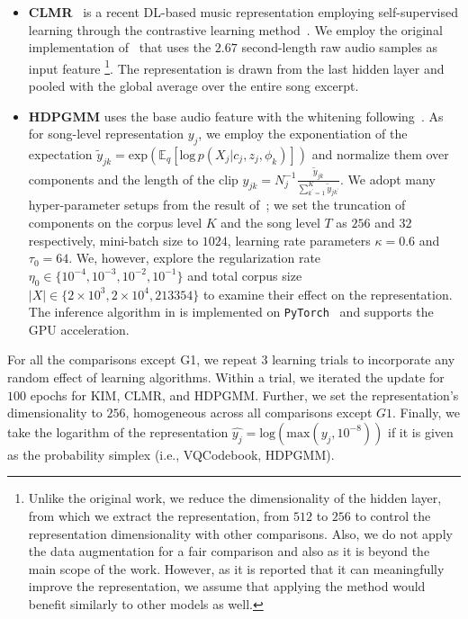\documentclass{article}
\begin{document}
\begin{itemize}[noitemsep, leftmargin=*]
    \item \textbf{CLMR}~\cite{DBLP:conf/ismir/SpijkervetB21} is a recent DL-based music representation employing self-supervised learning through the contrastive learning method~\cite{DBLP:conf/icml/ChenK0H20}. We employ the original implementation of~\cite{DBLP:conf/ismir/SpijkervetB21} that uses the $2.67$ second-length raw audio samples as input feature
        \footnote{Unlike the original work, we reduce the dimensionality of the hidden layer, from which we extract the representation, from $512$ to $256$ to control the representation dimensionality with other comparisons. Also, we do not apply the data augmentation for a fair comparison and also as it is beyond the main scope of the work. However, as it is reported that it can meaningfully improve the representation, we assume that applying the method would benefit similarly to other models as well.}.
        The representation is drawn from the last hidden layer and pooled with the global average over the entire song excerpt.

    \item \textbf{HDPGMM}
        uses the base audio feature with the whitening following~\cite{DBLP:conf/ismir/NamHSS12}. As for song-level representation $y_{j}$, we employ the  exponentiation of the expectation $\tilde{y}_{jk} = \text{exp}(\mathbb{E}_{q}[\text{log}\,p(X_{j}|c_{j}, z_{j}, \phi_{k})])$ and normalize them over components and the length of the clip $y_{jk} = N_{j}^{-1}\frac{\tilde{y}_{jk}}{\sum_{k^{\prime}=1}^{K}\tilde{y}_{jk^{\prime}}}$. We adopt many hyper-parameter setups from the result of~\cite{DBLP:journals/jmlr/WangPB11}; we set the truncation of components on the corpus level $K$ and the song level $T$ as $256$ and $32$ respectively, mini-batch size to $1024$, learning rate parameters $\kappa=0.6$ and $\tau_{0}=64$. We, however, explore the regularization rate $\eta_{0} \in \{10^{-4}, 10^{-3}, 10^{-2}, 10^{-1}\}$ and total corpus size $|X| \in \{2\times10^{3}, 2\times10^{4}, 213354\}$ to examine their effect on the representation. The inference algorithm in  is implemented on \texttt{PyTorch}~\cite{NEURIPS2019_9015} and supports the GPU acceleration.
\end{itemize}

For all the comparisons except G1, we repeat $3$ learning trials to incorporate any random effect of learning algorithms. Within a trial, we iterated the update for $100$ epochs for KIM, CLMR, and HDPGMM. Further, we set the representation's dimensionality to $256$, homogeneous across all comparisons except $G1$. Finally, we take the logarithm of the representation $\hat{y_{j}} = \text{log}(\text{max}(y_{j}, 10^{-8}))$ if it is given as the probability simplex (i.e., VQCodebook, HDPGMM).
\end{document}
